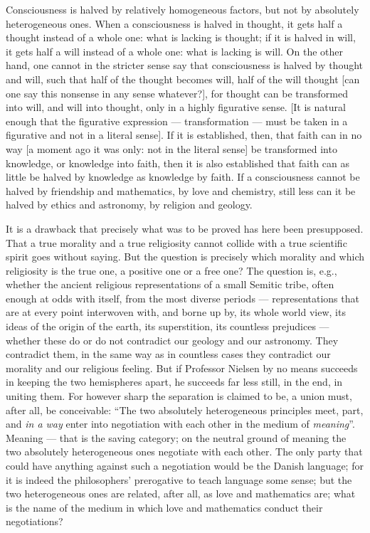 \documentclass[12pt,a4paper,openany]{book}
\newcommand{\opage}[1]{\marginnote{\footnotesize\textit{[#1]}}}
\begin{document}
{\small
Consciousness is halved by relatively homogeneous factors, but not by
absolutely heterogeneous ones. When a consciousness is halved in thought, it
gets half a thought instead of a whole one: what is lacking is thought; if it
is halved in will, it gets half a will instead of a whole one: what is lacking
is will. On the other hand, one cannot in the stricter sense say that
consciousness is halved by thought and will, such that half of the thought
becomes will, half of the will thought [can one say this nonsense in any
sense whatever?], for thought can be transformed into will, and will into
thought, only in a highly figurative sense. [It is natural enough that the
figurative expression --- transformation --- must be taken in a figurative
and not in a literal sense]. If it is established, then, that faith can in no
way [a moment ago it was only: not in the literal sense] be transformed into
knowledge, or knowledge into faith, then it is also established that faith
can as little be halved by knowledge as knowledge by faith. If a
consciousness cannot be halved by friendship and mathematics, by love and
chemistry, still less can it be halved by ethics and astronomy, by religion
and geology.\par}

It is a drawback that precisely what was to be proved has here been
presupposed. That a true morality and a true religiosity cannot collide
with a true scientific spirit goes without saying. But the question is
precisely which morality and which religiosity is the true one, a
positive one or a free one? The question is, e.g., whether the ancient
religious representations of a small Semitic tribe, often enough at odds
with itself, from the most diverse periods --- representations that are
at every point interwoven with, and borne up by, its whole world view,
its ideas of the origin of the earth, its superstition, its countless
prejudices --- whether these do or do not contradict our geology and our
astronomy. They contradict them, in the same way as in countless cases
they contradict our morality and our religious feeling. But if Professor
Nielsen by no means succeeds in keeping the two hemispheres apart, he
succeeds far less still, in the end, in uniting them. For however sharp
the separation is claimed to be, a union must, after all, be
conceivable: ``The two absolutely heterogeneous principles meet, part,
and \emph{in a way} enter into negotiation with each other in the medium
of \emph{meaning}''. Meaning --- that is the saving category; on the %
neutral ground of meaning the two absolutely
\opage{89}heterogeneous ones negotiate with each other. The only party that
could have anything against such a negotiation would be the Danish
language; for it is indeed the philosophers' prerogative to teach
language some sense; but the two heterogeneous ones are related, after
all, as love and mathematics are; what is the name of the medium in
which love and mathematics conduct their negotiations?
\end{document}
